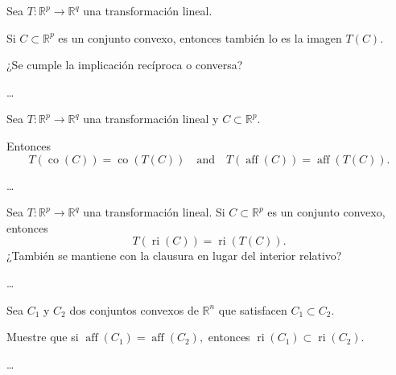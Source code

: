 \documentclass{testfcuni} %
\begin{document}
\begin{questions}
  \question

  Sea $T\colon\mathds{R}^{p}\to\mathds{R}^{q}$ una transformación lineal.

  Si $C\subset\mathds{R}^{p}$ es un conjunto convexo, entonces también lo es la imagen $T\left(C\right)$.

  ¿Se cumple la implicación recíproca o conversa?

  \begin{solution}
    \ldots
  \end{solution}

  \question

  Sea $T\colon\mathds{R}^{p}\rightarrow\mathds{R}^{q}$ una transformación lineal y $C\subset\mathds{R}^{p}$.

  Entonces
  \[
    T\left(\operatorname{co}\left(C\right)\right)=
    \operatorname{co}\left(T\left(C\right)\right)\quad
    \text{and}\quad
    T\left(\operatorname{aff}\left(C\right)\right)=
    \operatorname{aff}\left(T\left(C\right)\right).
  \]

  \begin{solution}
    \ldots
  \end{solution}

  \question

  Sea $T\colon\mathds{R}^{p}\rightarrow\mathds{R}^{q}$ una transformación lineal.
  Si $C\subset\mathds{R}^{p}$ es un conjunto convexo, entonces
  \[
    T\left(\operatorname{ri}\left(C\right)\right)=
    \operatorname{ri}\left(T\left(C\right)\right).
  \]
  ¿También se mantiene con la clausura en lugar del interior
  relativo?

  \begin{solution}
    \ldots
  \end{solution}

  \question

  Sea $C_{1}$ y $C_{2}$ dos conjuntos convexos de $\mathds{R}^{n}$ que satisfacen $C_{1}\subset C_{2}$.

  Muestre que si
  \begin{math}
    \operatorname{aff}
    \left(C_{1}\right)=
    \operatorname{aff}
    \left(C_{2}\right),
  \end{math}
  entonces
  \begin{math}
    \operatorname{ri}
    \left(C_{1}\right)\subset
    \operatorname{ri}
    \left(C_{2}\right).
  \end{math}

  \begin{solution}
    \ldots
  \end{solution}


\end{questions}
\end{document}
